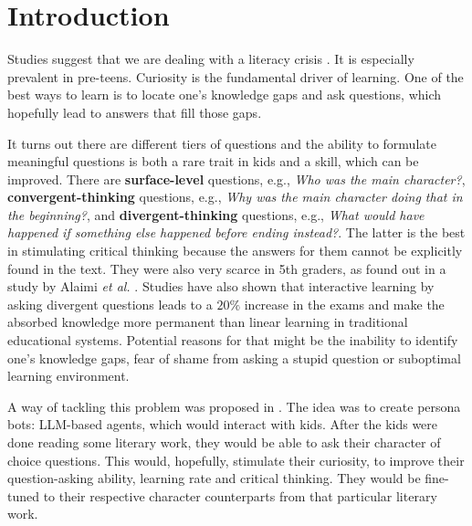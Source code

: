 \documentclass[fleqn,moreauthors,10pt]{ds_report}
\affiliation{\textit{Advisors: Slavko Žitnik}}
\begin{document}
\flushbottom 

\maketitle 
 
\thispagestyle{empty}


\section*{Introduction}

Studies suggest that we are dealing with a literacy crisis \cite{nielen_digital_2018}.
It is especially prevalent in pre-teens. Curiosity is the fundamental driver of learning.
One of the best ways to learn is to locate one's knowledge gaps and ask questions, which
hopefully lead to answers that fill those gaps.

It turns out there are different tiers of questions and the ability to
formulate meaningful questions is both a rare trait in kids and a skill,
which can be improved. There are \textbf{surface-level} questions, e.g., 
\emph{Who was the main character?}, \textbf{conver\-gent-thinking}
questions, e.g., \emph{Why was the main character doing that in the
beginning?}, and \textbf{divergent-thinking} questions, e.g., \emph{What
would have happened if something else happened before ending instead?}.
The latter is the best in stimulating critical thinking because the
answers for them cannot be explicitly found in the text. They were also
very scarce in 5th graders, as found out in a study by Alaimi
\emph{et al.} \cite{alaimi_pedagogical_2020}. Studies have also shown that
interactive learning by asking divergent questions leads to a $20\%$ 
increase in the exams and make the absorbed knowledge more permanent
than linear learning in traditional educational systems. Potential reasons 
for that might be the inability to identify one's knowledge gaps,
fear of shame from asking a stupid question or suboptimal learning
environment.

A way of tackling this problem was proposed in \cite{alaimi_pedagogical_2020}. The idea
was to create persona bots: LLM-based agents, which would interact with kids. After the
kids were done reading some literary work, they would be able to ask their character of
choice questions. This would, hopefully, stimulate their curiosity, to improve their
question-asking ability, learning rate and critical thinking. They would be fine-tuned
to their respective character counterparts from that particular literary work. 
\end{document}
